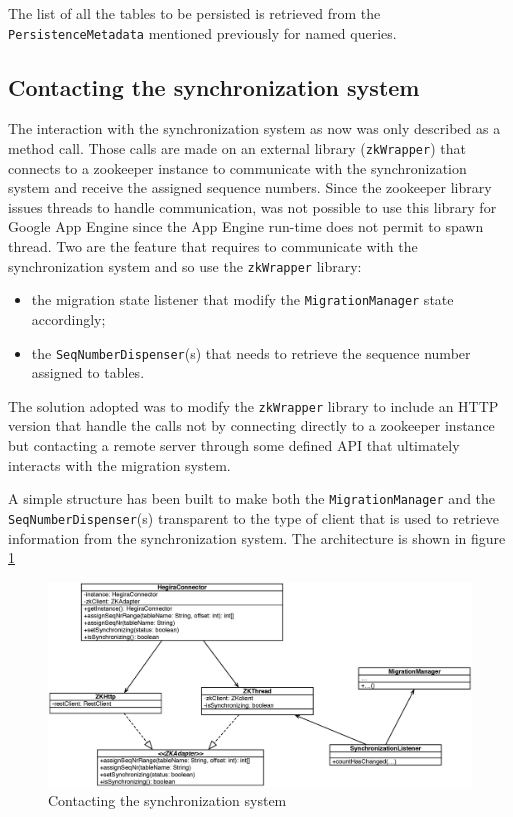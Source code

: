 \noindent The list of all the tables to be persisted is retrieved from the \texttt{PersistenceMetadata} mentioned previously for named queries.
 
\subsection{Contacting the synchronization system}
The interaction with the synchronization system as now was only described as a method call. Those calls are made on an external library (\texttt{zkWrapper}) that connects to a zookeeper instance to communicate with the synchronization system and receive the assigned sequence numbers.
Since the zookeeper library issues threads to handle communication, was not possible to use this library for Google App Engine since the App Engine run-time does not permit to spawn thread.
Two are the feature that requires to communicate with the synchronization system and so use the \texttt{zkWrapper} library:
\begin{itemize}
\item the migration state listener that modify the \texttt{MigrationManager} state accordingly;
\item the \texttt{SeqNumberDispenser}(s) that needs to retrieve the sequence number assigned to tables.
\end{itemize} 
\noindent The solution adopted was to modify the \texttt{zkWrapper} library to include an HTTP version that handle the calls not by connecting directly to a zookeeper instance but contacting a remote server through some defined API that ultimately interacts with the migration system.

\newparagraph A simple structure has been built to make both the \texttt{MigrationManager} and the \texttt{SeqNumberDispenser}(s) transparent to the type of client that is used to retrieve information from the synchronization system. The architecture is shown in figure \ref{fig:zk-adapter}

\begin{figure}[tbh]
  \centering
  \includegraphics[width=14cm]{images/zk_adapter}
  \caption{Contacting the synchronization system}
  \label{fig:zk-adapter}
\end{figure} 

